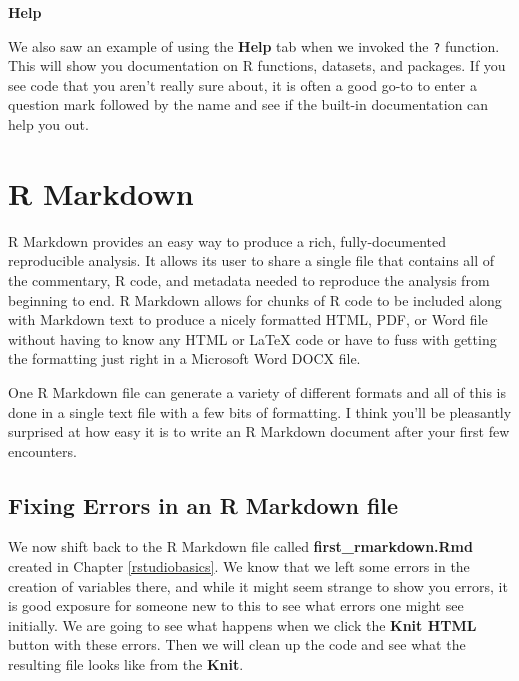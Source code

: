 \documentclass[]{tufte-book}
\begin{document}
\vspace*{0.2in}

\noindent\textbf{Help}\vspace*{0.1in}

We also saw an example of using the \textbf{Help} tab when we invoked
the \texttt{?} function. This will show you documentation on R
functions, datasets, and packages. If you see code that you aren't
really sure about, it is often a good go-to to enter a question mark
followed by the name and see if the built-in documentation can help you
out.

\chapter{R Markdown}\label{rmarkdown}

R Markdown provides an easy way to produce a rich, fully-documented
reproducible analysis. It allows its user to share a single file that
contains all of the commentary, R code, and metadata needed to reproduce
the analysis from beginning to end. R Markdown allows for chunks of R
code to be included along with Markdown text to produce a nicely
formatted HTML, PDF, or Word file without having to know any HTML or
LaTeX code or have to fuss with getting the formatting just right in a
Microsoft Word DOCX file.

One R Markdown file can generate a variety of different formats and all
of this is done in a single text file with a few bits of formatting. I
think you'll be pleasantly surprised at how easy it is to write an R
Markdown document after your first few encounters.

\section{Fixing Errors in an R Markdown file}\label{fixerrors}

We now shift back to the R Markdown file called
\textbf{first\_rmarkdown.Rmd} created in Chapter \ref{rstudiobasics}. We
know that we left some errors in the creation of variables there, and
while it might seem strange to show you errors, it is good exposure for
someone new to this to see what errors one might see initially. We are
going to see what happens when we click the \textbf{Knit HTML} button
with these errors. Then we will clean up the code and see what the
resulting file looks like from the \textbf{Knit}.

\vspace{0.1in}
\end{document}
